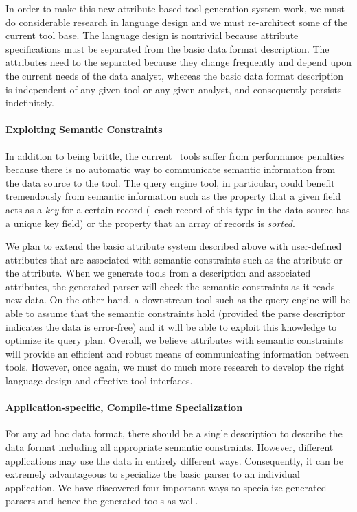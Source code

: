 \documentclass[11pt]{article}
\begin{document}
In order to make this new attribute-based tool generation system work,
we must do considerable research in language design and we must
re-architect some of the current tool base.  The language design is
nontrivial because attribute specifications must be separated from the
basic data format description.  The attributes need to the separated
because they change frequently and depend upon the current needs of
the data analyst, whereas the basic data format description is
independent of any given tool or any given analyst, and consequently
persists indefinitely.

\paragraph*{Exploiting Semantic Constraints}
In addition to being brittle, the current \pads{}\ tools suffer from
performance penalties because there is no automatic way to communicate
semantic information from the data source to the tool.  The query
engine tool, in particular, could benefit tremendously from semantic
information such as the property that a given field acts as a {\em
key} for a certain record (\ie\  each record of this type in the data
source has a unique key field) or the property that an array of
records is {\em sorted}.

We plan to extend the basic attribute system described above with
user-defined attributes that are associated with semantic constraints
such as the  attribute or the  attribute.  When we
generate tools from a \pads{} description and associated attributes,
the generated parser will check the semantic constraints as it reads
new data.  On the other hand, a downstream tool such as the query
engine will be able to assume that the semantic constraints hold
(provided the parse descriptor indicates the data is error-free) and
it will be able to exploit this knowledge to optimize its query plan.
Overall, we believe attributes with semantic constraints will provide
an efficient and robust means of communicating information between
tools.  However, once again, we must do much more research to develop
the right language design and effective tool interfaces.


\paragraph*{Application-specific, Compile-time Specialization}
For any ad hoc data format, there should be a single \pads{} description
to describe the data format including all appropriate
semantic constraints.  However, different applications
may use the data in entirely different ways.  Consequently,
it can be extremely advantageous to specialize the basic
parser to an individual application.  We have discovered
four important ways to specialize generated \pads{} parsers
and hence the generated tools as well.
\end{document}
